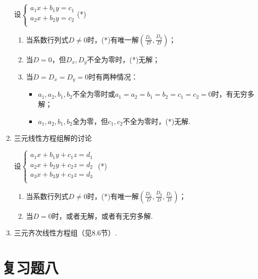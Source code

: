 \begin{enumerate}
设$\begin{cases}
  a_1x+b_1y=c_1\\
  a_2x+b_2y=c_2\\
\end{cases}$\hfill (*)
\begin{enumerate}[(1)]
  \item 当系数行列式$D\ne 0$时，(*)有唯一解$\left(\frac{D_x}{D}, \frac{D_y}{D}\right)$；
  \item 当$D=0$，但$D_x,D_y$不全为零时，(*)无解；
  \item 当$D=D_x=D_y=0$时有两种情况：
\begin{itemize}
  \item $a_1,a_2,b_1,b_2$不全为零时或$a_1=a_2=b_1=b_2=c_1=c_2=0$时，有无穷多解；
  \item $a_1,a_2,b_1,b_2$全为零，但$c_1,c_2$不全为零时，(*)无解.
\end{itemize}
\end{enumerate}
  \item 三元线性方程组解的讨论

  设$\begin{cases}
  a_1x+b_1y+c_1z=d_1\\
  a_2x+b_2y+c_2z=d_2\\
  a_3x+b_3y+c_3z=d_3\\
  \end{cases}$ \hfill(*)
\begin{enumerate}[(1)]
  \item 当系数行列式$D\ne 0$时，(*)有唯一解$\left(\frac{D_x}{D}, \frac{D_y}{D}, \frac{D_z}{D}\right)$；
  \item 当$D=0$时，或者无解，或者有无穷多解.
\end{enumerate}
\item 三元齐次线性方程组（见8.6节）.
\end{enumerate}

\section*{复习题八}

